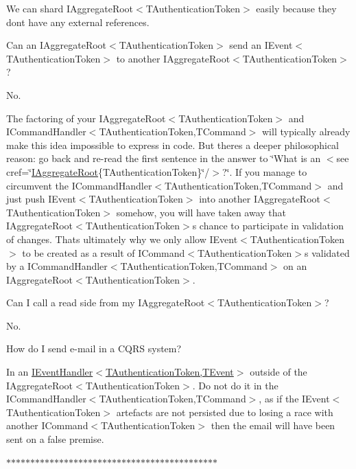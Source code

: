We can shard I\+Aggregate\+Root$<$\+T\+Authentication\+Token$>$ easily because they don\textquotesingle{}t have any external references. 

Can an I\+Aggregate\+Root$<$\+T\+Authentication\+Token$>$ send an I\+Event$<$\+T\+Authentication\+Token$>$ to another I\+Aggregate\+Root$<$\+T\+Authentication\+Token$>$? 

No. 

The factoring of your I\+Aggregate\+Root$<$\+T\+Authentication\+Token$>$ and I\+Command\+Handler$<$\+T\+Authentication\+Token,\+T\+Command$>$ will typically already make this idea impossible to express in code. But there\textquotesingle{}s a deeper philosophical reason\+: go back and re-\/read the first sentence in the answer to \char`\"{}\+What is an $<$see cref=\char`\"{}\hyperlink{interfaceCqrs_1_1Domain_1_1IAggregateRoot}{I\+Aggregate\+Root}\{T\+Authentication\+Token\}\char`\"{}/$>$?\char`\"{}. If you manage to circumvent the I\+Command\+Handler$<$\+T\+Authentication\+Token,\+T\+Command$>$ and just push I\+Event$<$\+T\+Authentication\+Token$>$ into another I\+Aggregate\+Root$<$\+T\+Authentication\+Token$>$ somehow, you will have taken away that I\+Aggregate\+Root$<$\+T\+Authentication\+Token$>$\textquotesingle{}s chance to participate in validation of changes. That\textquotesingle{}s ultimately why we only allow I\+Event$<$\+T\+Authentication\+Token$>$ to be created as a result of I\+Command$<$\+T\+Authentication\+Token$>$s validated by a I\+Command\+Handler$<$\+T\+Authentication\+Token,\+T\+Command$>$ on an I\+Aggregate\+Root$<$\+T\+Authentication\+Token$>$. 

Can I call a read side from my I\+Aggregate\+Root$<$\+T\+Authentication\+Token$>$? 

No. 

How do I send e-\/mail in a C\+Q\+RS system? 

In an \hyperlink{interfaceCqrs_1_1Events_1_1IEventHandler}{I\+Event\+Handler$<$\+T\+Authentication\+Token,\+T\+Event$>$} outside of the I\+Aggregate\+Root$<$\+T\+Authentication\+Token$>$. Do not do it in the I\+Command\+Handler$<$\+T\+Authentication\+Token,\+T\+Command$>$, as if the I\+Event$<$\+T\+Authentication\+Token$>$ artefacts are not persisted due to losing a race with another I\+Command$<$\+T\+Authentication\+Token$>$ then the email will have been sent on a false premise. 

$\ast$$\ast$$\ast$$\ast$$\ast$$\ast$$\ast$$\ast$$\ast$$\ast$$\ast$$\ast$$\ast$$\ast$$\ast$$\ast$$\ast$$\ast$$\ast$$\ast$$\ast$$\ast$$\ast$$\ast$$\ast$$\ast$$\ast$$\ast$$\ast$$\ast$$\ast$$\ast$$\ast$$\ast$$\ast$$\ast$$\ast$$\ast$$\ast$$\ast$$\ast$$\ast$$\ast$$\ast$ 

